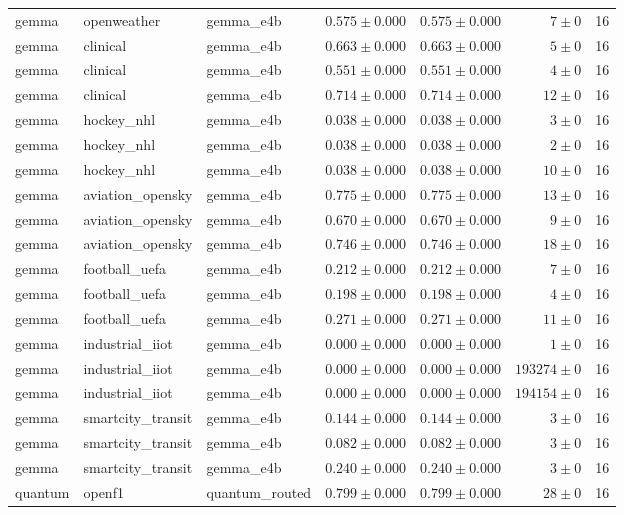 \begin{table}[htbp]
\begin{tabular}{l l l r r r r}
gemma & openweather & gemma\_e4b & $0.575\pm0.000$ & $0.575\pm0.000$ & $7\pm0$ & 16 \\
gemma & clinical & gemma\_e4b & $0.663\pm0.000$ & $0.663\pm0.000$ & $5\pm0$ & 16 \\
gemma & clinical & gemma\_e4b & $0.551\pm0.000$ & $0.551\pm0.000$ & $4\pm0$ & 16 \\
gemma & clinical & gemma\_e4b & $0.714\pm0.000$ & $0.714\pm0.000$ & $12\pm0$ & 16 \\
gemma & hockey\_nhl & gemma\_e4b & $0.038\pm0.000$ & $0.038\pm0.000$ & $3\pm0$ & 16 \\
gemma & hockey\_nhl & gemma\_e4b & $0.038\pm0.000$ & $0.038\pm0.000$ & $2\pm0$ & 16 \\
gemma & hockey\_nhl & gemma\_e4b & $0.038\pm0.000$ & $0.038\pm0.000$ & $10\pm0$ & 16 \\
gemma & aviation\_opensky & gemma\_e4b & $0.775\pm0.000$ & $0.775\pm0.000$ & $13\pm0$ & 16 \\
gemma & aviation\_opensky & gemma\_e4b & $0.670\pm0.000$ & $0.670\pm0.000$ & $9\pm0$ & 16 \\
gemma & aviation\_opensky & gemma\_e4b & $0.746\pm0.000$ & $0.746\pm0.000$ & $18\pm0$ & 16 \\
gemma & football\_uefa & gemma\_e4b & $0.212\pm0.000$ & $0.212\pm0.000$ & $7\pm0$ & 16 \\
gemma & football\_uefa & gemma\_e4b & $0.198\pm0.000$ & $0.198\pm0.000$ & $4\pm0$ & 16 \\
gemma & football\_uefa & gemma\_e4b & $0.271\pm0.000$ & $0.271\pm0.000$ & $11\pm0$ & 16 \\
gemma & industrial\_iiot & gemma\_e4b & $0.000\pm0.000$ & $0.000\pm0.000$ & $1\pm0$ & 16 \\
gemma & industrial\_iiot & gemma\_e4b & $0.000\pm0.000$ & $0.000\pm0.000$ & $193274\pm0$ & 16 \\
gemma & industrial\_iiot & gemma\_e4b & $0.000\pm0.000$ & $0.000\pm0.000$ & $194154\pm0$ & 16 \\
gemma & smartcity\_transit & gemma\_e4b & $0.144\pm0.000$ & $0.144\pm0.000$ & $3\pm0$ & 16 \\
gemma & smartcity\_transit & gemma\_e4b & $0.082\pm0.000$ & $0.082\pm0.000$ & $3\pm0$ & 16 \\
gemma & smartcity\_transit & gemma\_e4b & $0.240\pm0.000$ & $0.240\pm0.000$ & $3\pm0$ & 16 \\
quantum & openf1 & quantum\_routed & $0.799\pm0.000$ & $0.799\pm0.000$ & $28\pm0$ & 16 \\

\end{tabular}
\end{table}
